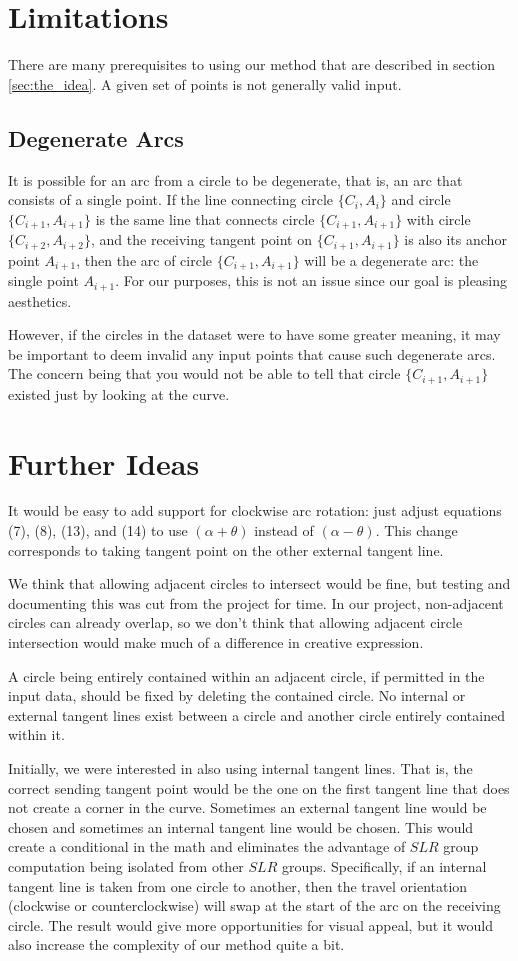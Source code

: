 \documentclass{article}
\begin{document}
\section{Limitations}
There are many prerequisites to using our method that are described in section \ref{sec:the_idea}. A given set of points is not generally valid input.

\subsection{Degenerate Arcs}
It is possible for an arc from a circle to be degenerate, that is, an arc that consists of a single point. If the line connecting circle $\{C_i, A_i\}$ and circle $\{C_{i+1}, A_{i+1}\}$ is the same line that connects circle $\{C_{i+1}, A_{i+1}\}$ with circle $\{C_{i+2}, A_{i+2}\}$, and the receiving tangent point on $\{C_{i+1}, A_{i+1}\}$ is also its anchor point $A_{i+1}$, then the arc of circle $\{C_{i+1}, A_{i+1}\}$ will be a degenerate arc: the single point $A_{i+1}$. For our purposes, this is not an issue since our goal is pleasing aesthetics.

However, if the circles in the dataset were to have some greater meaning, it may be important to deem invalid any input points that cause such degenerate arcs. The concern being that you would not be able to tell that circle $\{C_{i+1}, A_{i+1}\}$ existed just by looking at the curve.

\section{Further Ideas}
It would be easy to add support for clockwise arc rotation: just adjust equations (7), (8), (13), and (14) to use $(\alpha + \theta)$ instead of $(\alpha - \theta)$. This change corresponds to taking tangent point on the other external tangent line.

We think that allowing adjacent circles to intersect would be fine, but testing and documenting this was cut from the project for time. In our project, non-adjacent circles can already overlap, so we don't think that allowing adjacent circle intersection would make much of a difference in creative expression.

A circle being entirely contained within an adjacent circle, if permitted in the input data, should be fixed by deleting the contained circle. No internal or external tangent lines exist between a circle and another circle entirely contained within it.

Initially, we were interested in also using internal tangent lines. That is, the correct sending tangent point would be the one on the first tangent line that does not create a corner in the curve. Sometimes an external tangent line would be chosen and sometimes an internal tangent line would be chosen. This would create a conditional in the math and eliminates the advantage of $SLR$ group computation being isolated from other $SLR$ groups. Specifically, if an internal tangent line is taken from one circle to another, then the travel orientation (clockwise or counterclockwise) will swap at the start of the arc on the receiving circle. The result would give more opportunities for visual appeal, but it would also increase the complexity of our method quite a bit.
\end{document}
